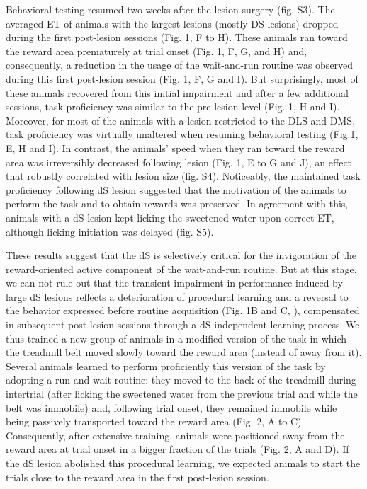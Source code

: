 Behavioral testing resumed two weeks after the lesion surgery (fig. S3).
The averaged ET of animals with the largest lesions (mostly DS lesions) dropped during the first post-lesion sessions (Fig. 1, F to H).
These animals ran toward the reward area prematurely at trial onset (Fig. 1, F, G, and H) and, consequently, a reduction in the usage of the wait-and-run routine was observed during this first post-lesion session (Fig. 1, F, G and I).
But surprisingly, most of these animals recovered from this initial impairment and after a few additional sessions, task proficiency was similar to the pre-lesion level (Fig. 1, H and I).
Moreover, for most of the animals with a lesion restricted to the DLS and DMS, task proficiency was virtually unaltered when resuming behavioral testing (Fig.1, E, H and I).
In contrast, the animals' speed when they ran toward the reward area was irreversibly decreased following lesion (Fig. 1, E to G and J), an effect that robustly correlated with lesion size (fig. S4).
Noticeably, the maintained task proficiency following dS lesion suggested that the motivation of the animals to perform the task and to obtain rewards was preserved. 
In agreement with this, animals with a  dS lesion kept licking the sweetened water upon correct ET, although licking initiation was delayed (fig. S5).
\par
These results suggest that the dS is selectively critical for the invigoration of the reward-oriented active component of the wait-and-run routine.
But at this stage, we can not rule out that the transient impairment in performance induced by large dS lesions reflects a deterioration of procedural learning and a reversal to the behavior expressed before routine acquisition (Fig. 1B and C, \cite{Dhawale2019}), compensated in subsequent post-lesion sessions through a dS-independent learning process.
We thus trained a new group of animals in a modified version of the task in which the treadmill belt moved slowly toward the reward area (instead of away from it).
Several animals learned to perform proficiently this version of the task by adopting a run-and-wait routine: they moved to the back of the treadmill during intertrial (after licking the sweetened water from the previous trial and while the belt was immobile) and, following trial onset, they remained immobile while being passively transported toward the reward area (Fig. 2, A to C).
Consequently, after extensive training, animals were positioned away from the reward area at trial onset in a bigger fraction of the trials (Fig. 2, A and D). 
If the dS lesion abolished this procedural learning, we expected animals to start the trials close to the reward area in the first post-lesion session. 
